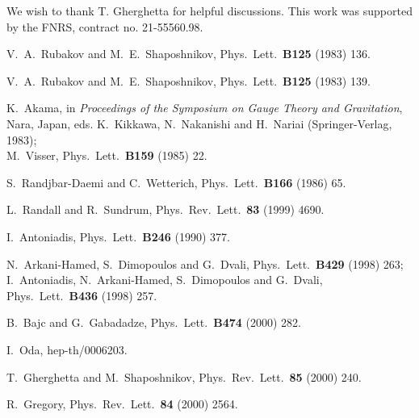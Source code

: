 \documentclass[a4paper,12pt]{article}
\begin{document}
 We wish to thank T. Gherghetta
for helpful discussions. This work was supported by the
FNRS,  contract no. 21-55560.98.

\begin{thebibliography}{99}

V.~A.~Rubakov and M.~E.~Shaposhnikov,
Phys.\ Lett.\  {\bf B125} (1983) 136.

V.~A.~Rubakov and M.~E.~Shaposhnikov,
Phys.\ Lett.\  {\bf B125} (1983) 139.

K.~Akama, in {\it Proceedings of the Symposium on Gauge Theory and 
Gravitation}, Nara, Japan, eds. K.~Kikkawa, N.~Nakanishi and H.~Nariai 
(Springer-Verlag, 1983);\\
M.~Visser,
Phys.\ Lett.\  {\bf B159} (1985) 22.

S.~Randjbar-Daemi and C.~Wetterich,
Phys.\ Lett.\  {\bf B166} (1986) 65.

L.~Randall and R.~Sundrum,
Phys.\ Rev.\ Lett.\  {\bf 83} (1999) 4690.

I.~Antoniadis,
Phys.\ Lett.\  {\bf B246} (1990) 377.

N.~Arkani-Hamed, S.~Dimopoulos and G.~Dvali,
Phys.\ Lett.\  {\bf B429} (1998) 263;\\
I.~Antoniadis, N.~Arkani-Hamed, S.~Dimopoulos and G.~Dvali,
Phys.\ Lett.\  {\bf B436} (1998) 257.

B.~Bajc and G.~Gabadadze,
Phys.\ Lett.\  {\bf B474} (2000) 282.

I.~Oda,
hep-th/0006203.

T.~Gherghetta and M.~Shaposhnikov,
Phys.\ Rev.\ Lett.\  {\bf 85} (2000) 240.

R.~Gregory,
Phys.\ Rev.\ Lett.\  {\bf 84} (2000) 2564.


\end{thebibliography}
\end{document}
